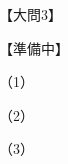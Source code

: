 \documentclass[../../../../hsm_tok_a.tex]{subfiles}
\begin{document}
    【大問3】

    【準備中】

    （1）


    （2）


    （3）

\end{document}
